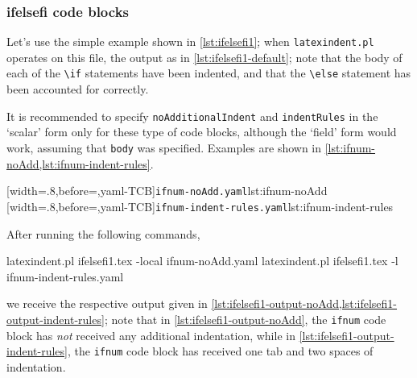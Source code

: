 \documentclass[10pt]{article}
\begin{document}
\subsubsection{ifelsefi code blocks}
 \begin{example}
 Let's use the simple example shown in \cref{lst:ifelsefi1}; when \texttt{latexindent.pl}
 operates on this file, the output as in \cref{lst:ifelsefi1-default}; note that the body
 of each of the \lstinline!\if! statements have been indented, and that the
 \lstinline!\else! statement has been accounted for correctly.

 \begin{cmhtcbraster}
 \end{cmhtcbraster}

 It is recommended to specify \texttt{noAdditionalIndent} and \texttt{indentRules} in the
 `scalar' form only for these type of code blocks, although the `field' form would work,
 assuming that \texttt{body} was specified. Examples are shown in
 \cref{lst:ifnum-noAdd,lst:ifnum-indent-rules}.

 \begin{cmhtcbraster}
  [width=.8\linewidth,before=\centering,yaml-TCB]{\texttt{ifnum-noAdd.yaml}}{lst:ifnum-noAdd}
  [width=.8\linewidth,before=\centering,yaml-TCB]{\texttt{ifnum-indent-rules.yaml}}{lst:ifnum-indent-rules}
 \end{cmhtcbraster}

 After running the following commands, 

 \begin{commandshell}
latexindent.pl ifelsefi1.tex -local ifnum-noAdd.yaml  
latexindent.pl ifelsefi1.tex -l ifnum-indent-rules.yaml  
\end{commandshell}

 we receive the respective output given in
 \cref{lst:ifelsefi1-output-noAdd,lst:ifelsefi1-output-indent-rules}; note that in
 \cref{lst:ifelsefi1-output-noAdd}, the \texttt{ifnum} code block has \emph{not} received
 any additional indentation, while in \cref{lst:ifelsefi1-output-indent-rules}, the
 \texttt{ifnum} code block has received one tab and two spaces of indentation.

 \begin{cmhtcbraster}
 \end{cmhtcbraster}
 \end{example}
\end{document}
